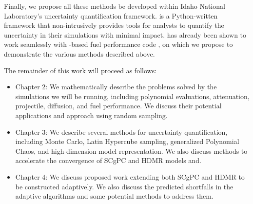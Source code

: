 Finally, we propose all these methods be developed within Idaho National Laboratory's \raven{}\cite{raven}
uncertainty quantification framework. \raven{} is a Python-written framework that non-intrusively provides
tools for analysts to quantify the uncertainty in their simulations with minimal impact. \raven{}  has already
been shown to work seamlessly with \moose{}-based fuel performance code \bison{}\cite{moose}\cite{bison}, on which we propose to demonstrate the various
methods described above.

The remainder of this work will proceed as follows:
\begin{itemize}
  \item Chapter 2: We mathematically describe the problems solved by the simulations we will be running,
    including polynomial evaluations, attenuation, projectile, diffusion, and fuel performance.  We discuss
    their potential applications and approach using random sampling.
  \item Chapter 3: We describe several methods for uncertainty quantification, including Monte Carlo, Latin
    Hypercube sampling, generalized Polynomial Chaos, and high-dimension model representation.  We also
    discuss methods to accelerate the convergence of SCgPC and HDMR models and.
  \item Chapter 4: We discuss proposed work extending both SCgPC and HDMR to be constructed adaptively.  We
    also discuss the predicted shortfalls in the adaptive algorithms and some potential methods to address
    them.
\end{itemize}

